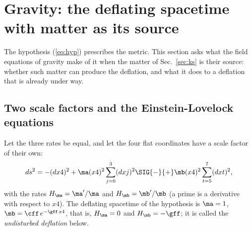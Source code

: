 \section{Gravity: the deflating spacetime with matter as its source}
\label{sec:gravity}

The hypothesis (\ref{eq:hyp}) prescribes the metric. This section asks what the field equations of
gravity make of it when the matter of Sec.~\ref{sec:ks} is their source: whether such matter can
produce the deflation, and what it does to a deflation that is already under way.

\subsection{Two scale factors and the Einstein-Lovelock equations}

Let the three rates be equal, and let the four flat coordinates have a scale factor of their own:
\begin{equation}
ds^{2}=-(dx4)^{2}+\ma(x4)^{2}\sum_{j=0}^{3}(dxj)^{2}\SIG{-}{+}\mb(x4)^{2}\sum_{t=5}^{7}(dxt)^{2},
\label{eq:twofactors}
\end{equation}
with the rates $H_{\ma}=\ma'/\ma$ and $H_{\mb}=\mb'/\mb$ (a prime is a derivative with respect to
$x4$). The deflating spacetime of the hypothesis is $\ma=1$, $\mb=\cff\,e^{-\gff\,x4}$, that is,
$H_{\ma}=0$ and $H_{\mb}=-\gff$; it is called the \emph{undisturbed deflation} below.

